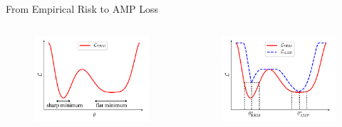 \begin{frame}{From Empirical Risk to AMP Loss}
\begin{columns}
\begin{figure}
\includegraphics[width=.8\textwidth]{figs/loss_example_a.pdf}
\end{figure}
\vspace{-1.5em}
\begin{figure}
\includegraphics[width=.8\textwidth]{figs/loss_example_b.pdf}
\end{figure}
\end{columns}

\vspace{2em}

\end{frame}


